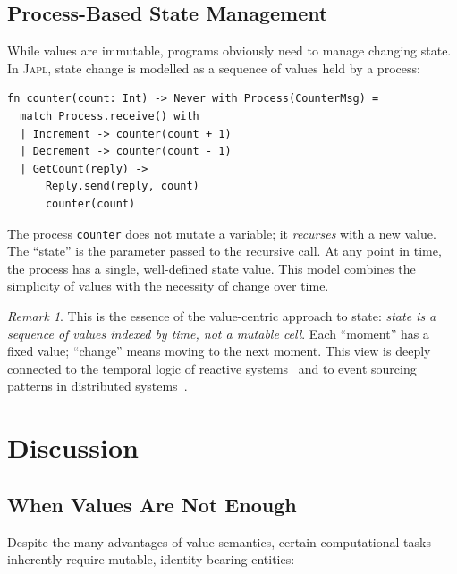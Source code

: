 \documentclass[11pt]{article}
\theoremstyle{definition}
\theoremstyle{remark}
\newtheorem{remark}[theorem]{Remark}
\newcommand{\japl}{\textsc{Japl}}
\begin{document}
\subsection{Process-Based State Management}

While values are immutable, programs obviously need to manage
changing state.  In \japl{}, state change is modelled as a sequence
of values held by a process:

\begin{lstlisting}[caption={State as a sequence of values.}]
fn counter(count: Int) -> Never with Process(CounterMsg) =
  match Process.receive() with
  | Increment -> counter(count + 1)
  | Decrement -> counter(count - 1)
  | GetCount(reply) ->
      Reply.send(reply, count)
      counter(count)
\end{lstlisting}

The process \texttt{counter} does not mutate a variable; it
\emph{recurses} with a new value.  The ``state'' is the parameter
passed to the recursive call.  At any point in time, the process has
a single, well-defined state value.  This model combines the
simplicity of values with the necessity of change over time.

\begin{remark}
This is the essence of the value-centric approach to state:
\emph{state is a sequence of values indexed by time, not a mutable
cell}.  Each ``moment'' has a fixed value; ``change'' means moving to
the next moment.  This view is deeply connected to the temporal logic
of reactive systems~\cite{pnueli1977temporal} and to event sourcing
patterns in distributed systems~\cite{fowler2005event}.
\end{remark}


\section{Discussion}
\label{sec:discussion}

\subsection{When Values Are Not Enough}

Despite the many advantages of value semantics, certain computational
tasks inherently require mutable, identity-bearing entities:
\end{document}
